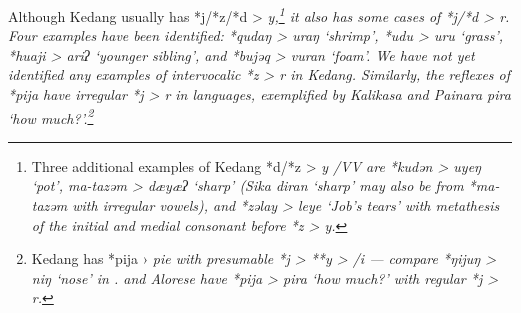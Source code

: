 Although Kedang usually has *j/*z/*d > \it{y},\footnote{\label{fn:Kedangd/z}
		Three additional examples of Kedang *d/*z > \it{y} /V{\gap}V
		are *kudən > \it{uyeŋ} ‘pot’,
		ma-tazəm > \it{dæyæʔ} ‘sharp’ (Sika \it{diran} ‘sharp’ may also
		be from *ma-tazəm with irregular vowels),
		and *zəlay > \it{leye} ‘Job’s tears’ with metathesis of the initial
		and medial consonant before *z > \it{y}.}
it also has
some cases of *j/*d > \it{r}.
Four examples have been identified: *qudaŋ > \it{uraŋ} ‘shrimp’,
*udu > \it{uru} ‘grass’,
*huaji > \it{ariʔ} ‘younger sibling’,
and *bujəq > \it{vuran} ‘foam’.
We have not yet identified any examples of intervocalic *z > \it{r} in Kedang.
Similarly, the reflexes of *pija have irregular *j > \it{r} in
 languages, exemplified by Kalikasa and Painara \it{pira} ‘how much?’.\footnote{Kedang
		has *pija › \it{pie} with presumable *j > **y > {\0} /i{\gap}
		--- compare *ŋijuŋ > \it{niŋ} ‘nose’ in .
		 and Alorese have *pija > \it{pira} ‘how
		much?’ with regular *j > \it{r}.}

